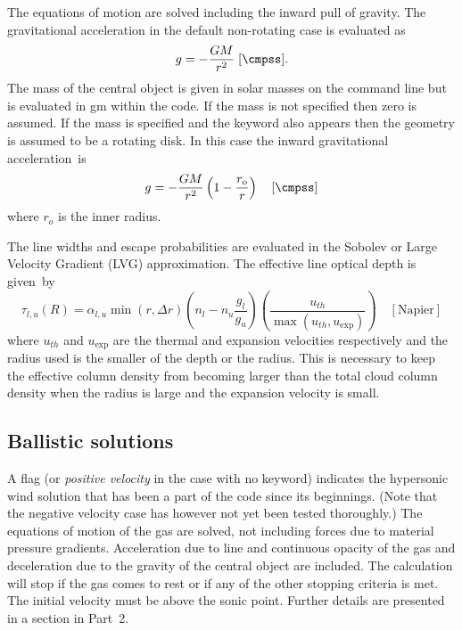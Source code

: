 The equations of motion are solved including the inward pull of gravity.
The gravitational acceleration in the default non-rotating case is
evaluated as
\begin{equation}
g =  - \frac{{GM}}{{r^2 }}\;
 [\cmpss].
\end{equation}
The mass of the central object is given in solar masses
on the command line but is evaluated in gm within the code.
If the mass is not specified then zero is assumed.
If the mass is specified and the keyword  also appears
then the geometry is assumed to be a rotating disk.
In this case the inward
gravitational acceleration~is
\begin{equation}
g =  - \frac{{GM}}{{r^2 }}\left( {1 - \frac{{r_{\mathrm{o}} }}{r}} \right)
\quad [\cmpss]
\end{equation}
where $r_o$ is the inner radius.

The line widths and escape probabilities are evaluated in the Sobolev
or Large Velocity Gradient (LVG) approximation.
The effective line optical depth is given~by
\begin{equation}
\tau_{l,u}(R)=\alpha_{l,u}\min (r,\Delta
r)\left(n_l-n_u\frac{g_l}{g_u}\right)\left(\frac{u_{th}}{\max
(u_{th},u_{\mathrm{exp}})}\right)\quad
  [\mathrm{Napier}]%
\end{equation}
where $u_{th}$ and $u_{\mathrm{exp}}$ are the thermal and expansion
velocities respectively
and the radius used is the smaller of the depth or the radius.
This is
necessary to keep the effective column density from becoming larger than
the total cloud column density when the radius is large and the expansion
velocity is small.

\subsection{Ballistic solutions}

A  flag (or \emph{positive velocity} in the case
with no  keyword) indicates the hypersonic
wind solution that has been a part of the code since its beginnings.
(Note that the negative velocity case has however not yet been tested
thoroughly.)  The equations of motion of the gas are solved, not
including forces due to material pressure gradients.  Acceleration due
to line and continuous opacity of the gas and deceleration due to the
gravity of the central object are included.  The calculation will stop
if the gas comes to rest or if any of the other stopping criteria is
met.  The initial velocity must be above the sonic point.  Further
details are presented in a section in Part~2.

